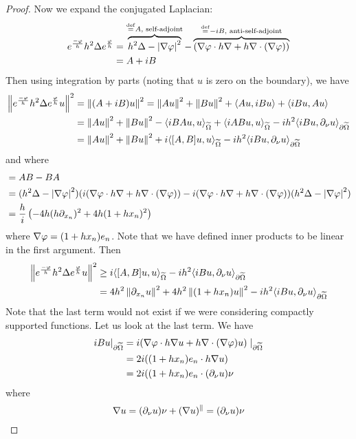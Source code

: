 \begin{proof}
  Now we expand the conjugated Laplacian:
  \begin{align*}
    e^\frac{-\varphi}{h} h^2 \Delta e^\frac{\varphi} h &= \overbrace{h^2\Delta - \left\lvert \nabla\varphi \right\rvert^2}^{\overset{\mathrm{def}}{=} A, \text{ self-adjoint}} - \overbrace{(\nabla\varphi \cdot h\nabla + h\nabla \cdot (\nabla\varphi))}^{\overset{\mathrm{def}}{=} -iB, \text{ anti-self-adjoint}} \\
    &= A+iB
  \end{align*}
  Then using integration by parts (noting that $u$ is zero on the boundary), we have
  \begin{align*}
    \left\lVert  e^\frac{-\varphi}{h} h^2 \Delta e^\frac{\varphi} h u  \right\rVert^2 &= \left\lVert  (A+iB)u \right\rVert^2 = \left\lVert Au \right\rVert^2+\left\lVert Bu \right\rVert^2 + {\left\langle Au,iBu \right\rangle} + {\left\langle iBu,Au \right\rangle} \\
    &= \left\lVert Au \right\rVert^2 + \left\lVert Bu \right\rVert^2 - {\left\langle iBAu,u \right\rangle}_{\widetilde\Omega} + {\left\langle iABu,u \right\rangle}_{\widetilde\Omega} - ih^2{\left\langle iBu,\partial_\nu u \right\rangle}_{\partial\widetilde\Omega} \\
    &= \left\lVert Au \right\rVert^2 + \left\lVert Bu \right\rVert^2 + i{\left\langle [A,B]u,u \right\rangle}_{\widetilde\Omega} -ih^2{\left\langle iBu,\partial_\nu u \right\rangle}_{\partial\widetilde\Omega}
  \end{align*}
  and where
  \begin{align*}
    [A,B] &= AB-BA \\
    &= (h^2\Delta-\abs{\nabla\ph}^2)(i(\nabla\ph \cdot h\nabla + h\nabla \cdot (\nabla\ph)) - i(\nabla\ph \cdot h\nabla + h \nabla \cdot (\nabla\ph)) (h^2\Delta - \abs{\nabla\ph}^2) \\
      &= \frac hi \left( -4h(h\p_{x_n})^2 + 4h(1+hx_n)^2 \right)
  \end{align*}
  where $\nabla\varphi = (1+hx_n)e_n$.
  Note that we have defined inner products to be linear in the first argument.
  Then
  \begin{align*}
    \left\lVert  e^\frac{-\varphi}{h} h^2 \Delta e^\frac{\varphi} h u  \right\rVert^2 &\geq i{\left\langle [A,B]u,u \right\rangle}_{\widetilde\Omega} -ih^2{\left\langle iBu,\partial_\nu u \right\rangle}_{\partial\widetilde\Omega} \\
    &= 4h^2 \left\lVert \partial_{x_n}u \right\rVert^2 + 4h^2\left\lVert (1+hx_n)u \right\rVert^2 - ih^2{\left\langle iBu,\partial_\nu u \right\rangle}_{\partial\widetilde\Omega}
  \end{align*}
  Note that the last term would not exist if we were considering compactly supported functions.
  Let us look at the last term.
  We have
  \begin{align*}
    iBu|_{\partial\widetilde\Omega} &= i( \nabla\varphi \cdot h\nabla u + h\nabla \cdot (\nabla\varphi )u) \mid_{\partial\widetilde\Omega} \\
    &= 2i( (1+hx_n)e_n \cdot h \nabla u) \\
    &= 2i( (1+hx_n)e_n \cdot (\partial_\nu u) \nu
  \end{align*}
  where
  \[ \nabla u = (\partial_\nu u) \nu + (\nabla u)^\parallel = (\partial_\nu u)\nu \]

\end{proof}
